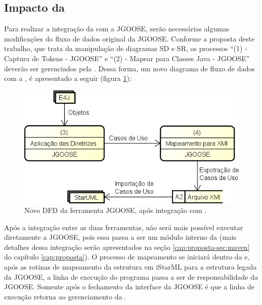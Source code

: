         \subsection{Impacto da \ferramenta{}}
            Para realizar a integração da \ferramenta{} com a JGOOSE, serão necessárias algumas modificações do fluxo de dados original da JGOOSE.
            Conforme a proposta deste trabalho, que trata da manipulação de diagramas SD e SR,
                os processos ``(1) - Captura de Tokens - JGOOSE'' e ``(2) - Mapear para Classes Java - JGOOSE''
                deverão ser gerenciados pela \ferramenta{}.
                Dessa forma, um novo diagrama de fluxo de dados com a \ferramenta{}, é apresentado a seguir (figura \ref{fig:dfd-proposta}):
                \begin{figure}[h!]
                    \centering
                        \includegraphics[scale=0.8]{Figuras/dfd-proposta.png}
                        \caption{Novo DFD da ferramenta JGOOSE, após integração com \ferramenta{}.}
                        \label{fig:dfd-proposta}
                \end{figure}

            Após a integração entre as duas ferramentas, não será mais possível executar diretamente a JGOOSE, pois essa passa a ser um módulo interno da \ferramenta{} (mais detalhes dessa integração serão apresentados na seção \ref{cap:proposta-sec:maven} do capítulo \ref{cap:proposta}).
            O processo de mapeamento se iniciará dentro da \ferramenta{} e, após as rotinas de mapeamento da estrutura em iStarML para a estrutura legada da JGOOSE, a linha de execução do programa passa a ser de responsabilidade da JGOOSE.
            Somente após o fechamento da interface da JGOOSE é que a linha de execução retorna ao gerenciamento da \ferramenta{}.

